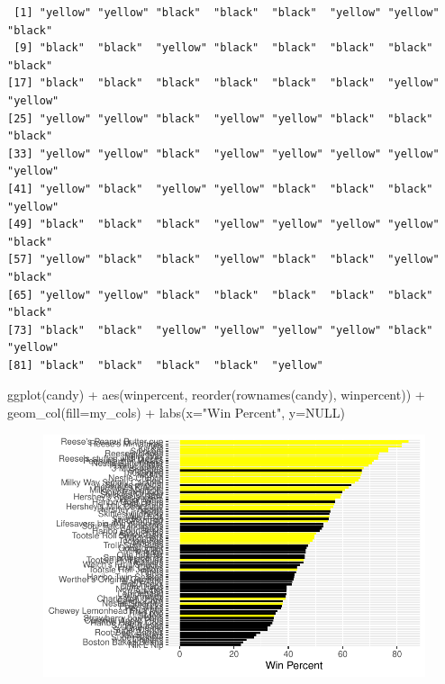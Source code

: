 \documentclass[
  letterpaper,
  DIV=11,
  numbers=noendperiod]{scrartcl}
\newenvironment{Shaded}{\begin{snugshade}}{\end{snugshade}}
\newcommand{\AttributeTok}[1]{\textcolor[rgb]{0.40,0.45,0.13}{#1}}
\newcommand{\ConstantTok}[1]{\textcolor[rgb]{0.56,0.35,0.01}{#1}}
\newcommand{\FunctionTok}[1]{\textcolor[rgb]{0.28,0.35,0.67}{#1}}
\newcommand{\NormalTok}[1]{\textcolor[rgb]{0.00,0.23,0.31}{#1}}
\newcommand{\SpecialCharTok}[1]{\textcolor[rgb]{0.37,0.37,0.37}{#1}}
\newcommand{\StringTok}[1]{\textcolor[rgb]{0.13,0.47,0.30}{#1}}
\begin{document}
\begin{verbatim}
 [1] "yellow" "yellow" "black"  "black"  "black"  "yellow" "yellow" "black" 
 [9] "black"  "black"  "yellow" "black"  "black"  "black"  "black"  "black" 
[17] "black"  "black"  "black"  "black"  "black"  "black"  "yellow" "yellow"
[25] "yellow" "yellow" "black"  "yellow" "yellow" "black"  "black"  "black" 
[33] "yellow" "yellow" "black"  "yellow" "yellow" "yellow" "yellow" "yellow"
[41] "yellow" "black"  "yellow" "yellow" "black"  "black"  "black"  "yellow"
[49] "black"  "black"  "black"  "yellow" "yellow" "yellow" "yellow" "black" 
[57] "yellow" "black"  "black"  "yellow" "black"  "black"  "yellow" "black" 
[65] "yellow" "yellow" "black"  "black"  "black"  "black"  "black"  "black" 
[73] "black"  "black"  "yellow" "yellow" "yellow" "yellow" "black"  "yellow"
[81] "black"  "black"  "black"  "black"  "yellow"
\end{verbatim}

\begin{Shaded}
\begin{Highlighting}[]
\FunctionTok{ggplot}\NormalTok{(candy) }\SpecialCharTok{+} 
  \FunctionTok{aes}\NormalTok{(winpercent, }\FunctionTok{reorder}\NormalTok{(}\FunctionTok{rownames}\NormalTok{(candy), winpercent)) }\SpecialCharTok{+} 
  \FunctionTok{geom\_col}\NormalTok{(}\AttributeTok{fill=}\NormalTok{my\_cols) }\SpecialCharTok{+} 
  \FunctionTok{labs}\NormalTok{(}\AttributeTok{x=}\StringTok{"Win Percent"}\NormalTok{, }\AttributeTok{y=}\ConstantTok{NULL}\NormalTok{)}
\end{Highlighting}
\end{Shaded}

\begin{figure}[H]

{\centering \includegraphics{Class-9_files/figure-pdf/unnamed-chunk-19-1.pdf}

}

\end{figure}
\end{document}
